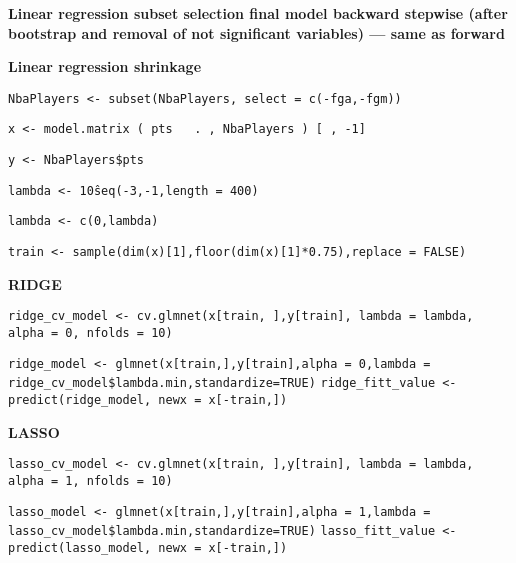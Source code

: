 \noindent
\textbf{Linear regression subset selection final model backward stepwise (after bootstrap and removal of not significant variables) --- same as forward}

\noindent
\textbf{Linear regression shrinkage}

\begin{center}
\texttt{NbaPlayers <- subset(NbaPlayers, select = c(-fga,-fgm))}

\texttt{x <- model.matrix ( pts ~ . , NbaPlayers ) [ , -1]}

\texttt{y <- NbaPlayers\$pts}

\texttt{lambda <- 10\^seq(-3,-1,length = 400)}

\texttt{lambda <- c(0,lambda)}

\texttt{train <- sample(dim(x)[1],floor(dim(x)[1]*0.75),replace = FALSE)}
\end{center}
	
\textbf{RIDGE}

\begin{center}
\texttt{ridge\_cv\_model <- cv.glmnet(x[train, ],y[train], lambda = lambda, alpha = 0, nfolds = 10)}

\texttt{ridge\_model <- glmnet(x[train,],y[train],alpha = 0,lambda = ridge\_cv\_model\$lambda.min,standardize=TRUE)}
\texttt{ridge\_fitt\_value <- predict(ridge\_model, newx = x[-train,])}
\end{center}
	
\textbf{LASSO}

\begin{center}
\texttt{lasso\_cv\_model <- cv.glmnet(x[train, ],y[train], lambda = lambda, alpha = 1, nfolds = 10)}

\texttt{lasso\_model <- glmnet(x[train,],y[train],alpha = 1,lambda = lasso\_cv\_model\$lambda.min,standardize=TRUE)}
\texttt{lasso\_fitt\_value <- predict(lasso\_model, newx = x[-train,])}
\end{center}